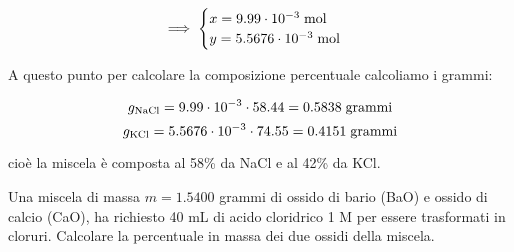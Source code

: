 \begin{soluzione}
$$\implies
\begin{cases}
    x=9.99 \cdot 10^{-3} \; \rm mol\\
    y=5.5676 \cdot 10^{-3} \; \rm mol
\end{cases}$$

A questo punto per calcolare la composizione percentuale calcoliamo i grammi:

$$g_{\rm NaCl}=9.99 \cdot 10^{-3} \cdot 58.44
=0.5838 \; \text{grammi}$$
$$g_{\rm KCl}=5.5676 \cdot 10^{-3} \cdot 74.55
=0.4151 \; \rm grammi$$

cioè la miscela è composta al 58\% da NaCl e al 42\% da KCl.

\end{soluzione}

\newpage

\begin{esercizio}
    Una miscela di massa $m=1.5400$ grammi di ossido di bario (BaO) e ossido di calcio (CaO), ha richiesto 40 mL di acido cloridrico 1 M per essere trasformati in cloruri. Calcolare la percentuale in massa dei due ossidi della miscela.
\end{esercizio}
